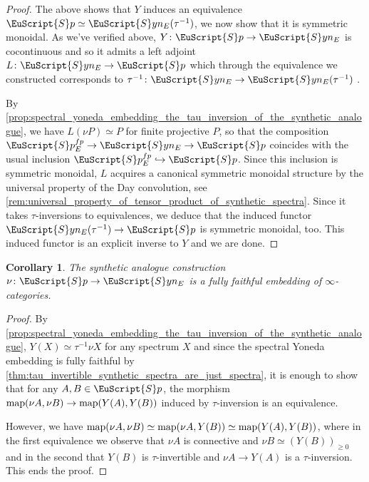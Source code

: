 \documentclass[oneside,a4paper]{amsart}
\newcommand{\euscr}[1]{\EuScript{#1}} %
\newcommand{\map}{\textnormal{map}} %
\newcommand{\spectra}{\euscr{S}p} %
\newcommand{\synspectra}{\euscr{S}yn} %
\theoremstyle{plain}
\newtheorem{cor}[thm]{Corollary}
\theoremstyle{definition}
\theoremstyle{remark}
\begin{document}
\begin{proof}
The above shows that $Y$ induces an equivalence $\spectra \simeq \synspectra_{E}(\tau^{-1})$, we now show that it is symmetric monoidal. As we've verified above, $Y \colon \spectra \rightarrow \synspectra_{E}$ is cocontinuous and so it admits a left adjoint $L \colon \synspectra_{E} \rightarrow \spectra$ which through the equivalence we constructed corresponds to $\tau^{-1} \colon \synspectra_{E} \rightarrow \synspectra_{E}(\tau^{-1})$ .

By \cref{prop:spectral_yoneda_embedding_the_tau_inversion_of_the_synthetic_analogue}, we have $L(\nu P) \simeq P$ for finite projective $P$, so that the composition $\spectra_{E}^{fp} \rightarrow \synspectra_{E} \rightarrow \spectra$ coincides with the usual inclusion $\spectra_{E}^{fp} \hookrightarrow \spectra$. Since this inclusion is symmetric monoidal, $L$ acquires a canonical symmetric monoidal structure by the universal property of the Day convolution, see \cref{rem:universal_property_of_tensor_product_of_synthetic_spectra}. Since it takes $\tau$-inversions to equivalences, we deduce that the induced functor $\synspectra_{E}(\tau^{-1}) \rightarrow \spectra$ is symmetric monoidal, too. This induced functor is an explicit inverse to $Y$ and we are done. 
\end{proof}

\begin{cor}
\label{cor:synthetic_analogue_a_fully_faithful_embedding_of_infinity_categories}
The synthetic analogue construction $\nu \colon \spectra \rightarrow \synspectra_{E}$ is a fully faithful embedding of $\infty$-categories. 
\end{cor}

\begin{proof}
By \cref{prop:spectral_yoneda_embedding_the_tau_inversion_of_the_synthetic_analogue}, $Y(X) \simeq \tau^{-1} \nu X$ for any spectrum $X$ and since the spectral Yoneda embedding is fully faithful by \cref{thm:tau_invertible_synthetic_spectra_are_just_spectra}, it is enough to show that for any $A, B \in \spectra$, the morphism $\map(\nu A, \nu B) \rightarrow \map (Y(A), Y(B))$ induced by $\tau$-inversion is an equivalence. 

However, we have $\map(\nu A, \nu B) \simeq \map(\nu A, Y(B)) \simeq \map(Y(A), Y(B))$, where in the first equivalence we observe that $\nu A$ is connective and $\nu B \simeq (Y(B))_{\geq 0}$ and in the second that $Y(B)$ is $\tau$-invertible and $\nu A \rightarrow Y(A)$ is a $\tau$-inversion. This ends the proof. 
\end{proof}
\end{document}
